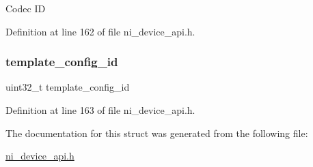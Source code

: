 Codec ID 

Definition at line 162 of file ni\+\_\+device\+\_\+api.\+h.

\mbox{\label{struct__ni__session__config_adc52c8b1e9517e8c5cf2805547fc3182}} 
\subsubsection{\texorpdfstring{template\_config\_id}{template\_config\_id}}
{\footnotesize\ttfamily uint32\+\_\+t template\+\_\+config\+\_\+id}



Definition at line 163 of file ni\+\_\+device\+\_\+api.\+h.



The documentation for this struct was generated from the following file\+:\begin{DoxyCompactItemize}
\item 
\mbox{\hyperlink{ni__device__api_8h}{ni\+\_\+device\+\_\+api.\+h}}\end{DoxyCompactItemize}

